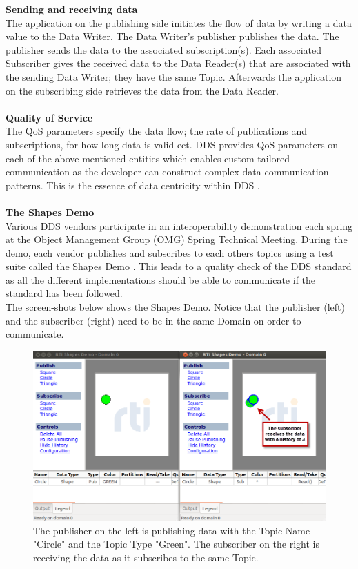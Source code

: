 \documentclass[Main]{subfiles}
\begin{document}
\textbf{Sending and receiving data}\\The application on the publishing side initiates the flow of data by writing a data value to the Data Writer. The Data Writer's publisher publishes the data. The publisher sends the data to the associated subscription(s). Each associated Subscriber gives the received data to the Data Reader(s) that are associated with the sending Data Writer; they have the same Topic. Afterwards the application on the subscribing side retrieves the data from the Data Reader.\\
\\
\textbf{Quality of Service}\\The QoS parameters specify the data flow; the rate of publications and subscriptions, for how long data is valid ect. DDS provides QoS parameters on each of the above-mentioned entities which enables custom tailored communication as the developer can construct complex data communication patterns. This is the essence of data centricity within DDS \cite{RTI} \cite{DDS-slides}.
\\
\\
\textbf{The Shapes Demo}\\Various DDS vendors participate in an interoperability demonstration each spring at the Object Management Group (OMG) Spring Technical Meeting. During the demo, each vendor publishes and subscribes to each others topics using a test suite called the Shapes Demo \cite{wiki-DDS}. This leads to a quality check of the DDS standard as all the different implementations should be able to communicate if the standard has been followed.\\The screen-shots below shows the Shapes Demo. Notice that the publisher (left) and the subscriber (right) need to be in the same Domain on order to communicate.
\\
\begin{figure}[H]
\centering
\includegraphics[scale=0.5]{Figure/SD3.png}
\caption{The publisher on the left is publishing data with the Topic Name "Circle" and the Topic Type "Green". The subscriber on the right is receiving the data as it subscribes to the same Topic.}
\end{figure}
\end{document}

